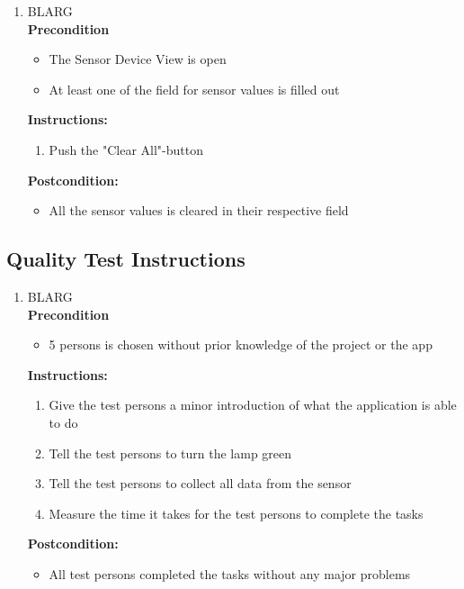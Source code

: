 \documentclass[a4paper]{article}
\newlength{\testlabellength}
\newenvironment{testlist}{\begin{enumerate}[label=\bfseries Instruction \thesubsection.\arabic* , labelindent=0pt, labelwidth=\testlabellength , leftmargin=2cm]}{\end{enumerate}}
\newenvironment{precondition}{
{\color{white}BLARG}\\ 
\textbf{Precondition}
\begin{itemize}[labelindent=0cm, labelwidth=2cm , leftmargin=1cm]
}
{\end{itemize}}
\newenvironment{instruction}{
\textbf{Instructions:}
\begin{enumerate}[label=\bfseries  \arabic*., labelindent=0cm, labelwidth=2cm , leftmargin=1cm]
}
{\end{enumerate}}
\newenvironment{postcondition}{
\textbf{Postcondition:}
\begin{itemize}[labelindent=0cm, labelwidth=2cm , leftmargin=1cm]
}
{\end{itemize}}
\begin{document}
\begin{appendices}
\begin{testlist}
	\item
	\begin{precondition} 
		\item The Sensor Device View is open
		\item At least one of the field for sensor values is filled out
		\end{precondition}
		\begin{instruction} 
		\item Push the "Clear All"-button
		\end{instruction}
	  	\begin{postcondition}
		\item All the sensor values is cleared in their respective field
		\end{postcondition}
\end{testlist}

\subsection{Quality Test Instructions}

\begin{testlist}

	\item
		\begin{precondition}
			\item 5 persons is chosen without prior knowledge of the project or the app
		\end{precondition}
		\begin{instruction}
			\item Give the test persons a minor introduction of what the application is able to do
            \item Tell the test persons to turn the lamp green
            \item Tell the test persons to collect all data from the sensor
            \item Measure the time it takes for the test persons to complete the tasks
		\end{instruction}
		\begin{postcondition}
			\item All test persons completed the tasks without any major problems
		\end{postcondition}


\end{testlist}
\end{appendices}
\end{document}
